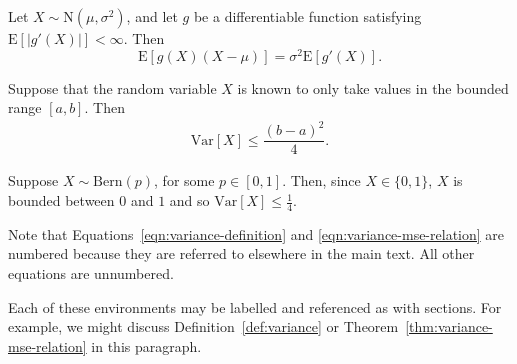 \begin{lemma}
    Let $X \sim \mathrm{N}(\mu, \sigma^2)$, and let $g$ be a differentiable 
    function satisfying $\mathrm{E}[|g'(X)|] < \infty$. Then
    \begin{equation}
        \mathrm{E}[g(X)(X-\mu)] = \sigma^2 \mathrm{E}[g'(X)].
        \nonumber
    \end{equation}
\end{lemma}

\begin{proposition}
    Suppose that the random variable $X$ is known to only take values in the 
    bounded range $[a, b]$. Then  
    \begin{align}
        \mathrm{Var}[X] \leq \dfrac{(b-a)^2}{4}.
        \nonumber
    \end{align}
\end{proposition}

\begin{example}
    Suppose $X \sim \mathrm{Bern} (p)$, for some $p \in [0,1]$. Then, 
    since $X \in \{0, 1\}$, $X$ is bounded between $0$ and $1$ and so
    $\mathrm{Var}[X] \leq \tfrac{1}{4}$.
\end{example}

Note that Equations~\eqref{eqn:variance-definition} and \eqref{eqn:variance-mse-relation} are numbered because they are referred to elsewhere in the main text. All other equations are unnumbered. 

Each of these environments may be labelled and referenced as with sections. For example, we might discuss Definition~\ref{def:variance} or Theorem~\ref{thm:variance-mse-relation} in this paragraph. 
